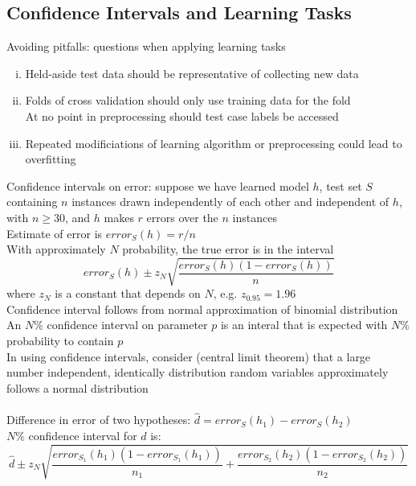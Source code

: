 \documentclass{article}
\begin{document}
		\subsection{Confidence Intervals and Learning Tasks}
			Avoiding pitfalls: questions when applying learning tasks
			\begin{enumerate}[(i)]
				\item Held-aside test data should be representative of collecting new data
				\item Folds of cross validation should only use training data for the fold \\
				At no point in preprocessing should test case labels be accessed
				\item Repeated modificiations of learning algorithm or preprocessing could lead to overfitting
				\end{enumerate}
			Confidence intervals on error: suppose we have learned model $h$, test set $S$ containing $n$ instances drawn independently of each other and independent of $h$, with $n \geq 30$, and $h$ makes $r$ errors over the $n$ instances \\
			Estimate of error is $error_S(h) = r/n$ \\
			With approximately $N$ probability, the true error is in the interval
			\begin{equation*}
				error_S(h) \pm z_N \sqrt{\frac{error_S(h)(1 - error_S(h))}{n}}
				\end{equation*}
			where $z_N$ is a constant that depends on $N$, e.g. $z_{0.95} = 1.96$ \\
			Confidence interval follows from normal approximation of binomial distribution \\
			An $N\%$ confidence interval on parameter $p$ is an interal that is expected with $N\%$ probability to contain $p$ \\
			In using confidence intervals, consider (central limit theorem) that a large number independent, identically distribution random variables approximately follows a normal distribution \\
			\\
			Difference in error of two hypotheses: $\hat{d} = error_S(h_1) - error_S(h_2)$ \\
			$N\%$ confidence interval for $d$ is:
			\begin{equation*}
			 	\hat{d} \pm z_N \sqrt{\frac{error_{S_1}(h_1)(1 - error_{S_1}(h_1))}{n_1} + \frac{error_{S_2}(h_2)(1 - error_{S_2}(h_2))}{n_2}}
				\end{equation*}
\end{document}
